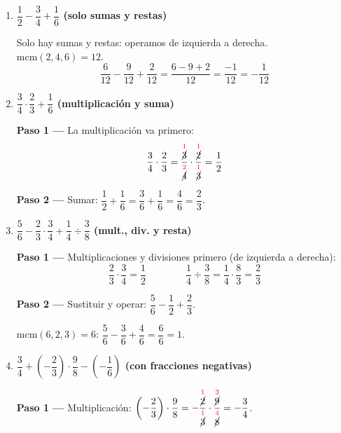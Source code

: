 \documentclass[11pt, letterpaper]{article}
\begin{document}
\begin{tcolorbox}[examplebox, title={Ejemplos sin s\'imbolos de agrupaci\'on (dificultad progresiva)}]
\begin{enumerate}[label=\textbf{Ej. \arabic*.}, leftmargin=*, itemsep=18pt]

\item \textbf{$\dfrac{1}{2} - \dfrac{3}{4} + \dfrac{1}{6}$ \quad (solo sumas y restas)}

Solo hay sumas y restas: operamos de izquierda a derecha. $\text{mcm}(2,4,6)=12$.
$$\frac{6}{12} - \frac{9}{12} + \frac{2}{12} = \frac{6 - 9 + 2}{12} = \frac{-1}{12} = -\frac{1}{12}$$

\item \textbf{$\dfrac{3}{4} \cdot \dfrac{2}{3} + \dfrac{1}{6}$ \quad (multiplicaci\'on y suma)}

\textbf{Paso 1 ---} La multiplicaci\'on va primero:
$$\frac{3}{4} \cdot \frac{2}{3} = \frac{\overset{\textcolor{red}{1}}{\cancel{3}}}{\overset{\textcolor{red}{2}}{\cancel{4}}} \cdot \frac{\overset{\textcolor{red}{1}}{\cancel{2}}}{\overset{\textcolor{red}{1}}{\cancel{3}}} = \frac{1}{2}$$

\textbf{Paso 2 ---} Sumar: $\dfrac{1}{2} + \dfrac{1}{6} = \dfrac{3}{6}+\dfrac{1}{6} = \dfrac{4}{6} = \dfrac{2}{3}$.

\item \textbf{$\dfrac{5}{6} - \dfrac{2}{3} \cdot \dfrac{3}{4} + \dfrac{1}{4} \div \dfrac{3}{8}$ \quad (mult., div. y resta)}

\textbf{Paso 1 ---} Multiplicaciones y divisiones primero (de izquierda a derecha):
$$\frac{2}{3} \cdot \frac{3}{4} = \frac{1}{2} \qquad\qquad \frac{1}{4} \div \frac{3}{8} = \frac{1}{4} \cdot \frac{8}{3} = \frac{2}{3}$$

\textbf{Paso 2 ---} Sustituir y operar: $\dfrac{5}{6} - \dfrac{1}{2} + \dfrac{2}{3}$.

$\text{mcm}(6,2,3)=6$: $\dfrac{5}{6} - \dfrac{3}{6} + \dfrac{4}{6} = \dfrac{6}{6} = 1$.

\item \textbf{$\dfrac{3}{4} + \left(-\dfrac{2}{3}\right) \cdot \dfrac{9}{8} - \left(-\dfrac{1}{6}\right)$ \quad (con fracciones negativas)}

\textbf{Paso 1 ---} Multiplicaci\'on: $\left(-\dfrac{2}{3}\right)\cdot\dfrac{9}{8} = -\dfrac{\overset{\textcolor{red}{1}}{\cancel{2}}}{\overset{\textcolor{red}{1}}{\cancel{3}}} \cdot \dfrac{\overset{\textcolor{red}{3}}{\cancel{9}}}{\overset{\textcolor{red}{4}}{\cancel{8}}} = -\dfrac{3}{4}$.


\end{enumerate}
\end{tcolorbox}
\end{document}
